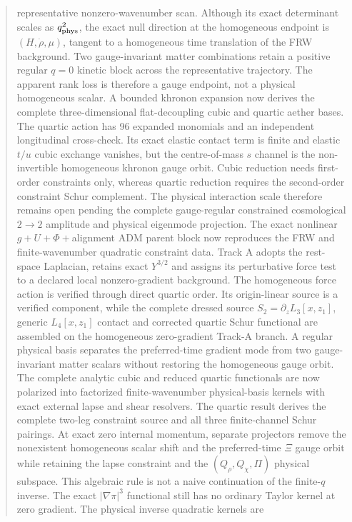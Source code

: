 ﻿\documentclass[11pt]{article}
\begin{document}
\begin{abstract}
representative nonzero-wavenumber scan.  Although its exact determinant scales
as $q_{\rm phys}^2$, the exact null direction at the homogeneous endpoint is
$(H,\dot\rho,\mu)$, tangent to a homogeneous time translation of the FRW
background.  Two gauge-invariant matter combinations retain a positive regular
$q=0$ kinetic block across the representative trajectory.  The apparent rank
loss is therefore a gauge endpoint, not a physical homogeneous scalar.  A
bounded khronon expansion now derives the complete three-dimensional
flat-decoupling cubic and quartic aether bases.  The quartic action has 96
expanded monomials and an independent longitudinal cross-check.  Its exact
elastic contact term is finite and elastic $t/u$ cubic exchange vanishes, but
the centre-of-mass $s$ channel is the non-invertible homogeneous khronon gauge
orbit.  Cubic reduction needs first-order constraints only, whereas quartic
reduction requires the second-order constraint Schur complement.  The physical
interaction scale therefore remains open pending the complete gauge-regular
constrained cosmological $2\to2$ amplitude and physical eigenmode projection.
The exact nonlinear $g+U+\Phi+$alignment ADM parent block now reproduces the
FRW and finite-wavenumber quadratic constraint data.  Track A adopts the
rest-space Laplacian, retains exact $Y^{3/2}$ and assigns its perturbative
force test to a declared local nonzero-gradient background.  The homogeneous
force action is verified through direct quartic order.  Its origin-linear
source is a verified component, while the complete dressed source
$S_2=\partial_zL_3[x,z_1]$, generic $L_4[x,z_1]$ contact and corrected
quartic Schur functional are assembled on the homogeneous zero-gradient
Track-A branch.  A regular physical basis separates the preferred-time
gradient mode from two gauge-invariant matter scalars without restoring the
homogeneous gauge orbit.  The complete analytic cubic and reduced quartic
functionals are now polarized into factorized finite-wavenumber
physical-basis kernels with exact
external lapse and shear resolvers.  The quartic result derives the complete
two-leg constraint source and all three finite-channel Schur pairings.  At
exact zero internal momentum, separate projectors remove the nonexistent
homogeneous scalar shift and the preferred-time $\Xi$ gauge orbit while
retaining the lapse constraint and the $(Q_\rho,Q_\chi,\Pi)$ physical
subspace.  This algebraic rule is not a naive continuation of the finite-$q$
inverse.  The exact $|\nabla\pi|^3$ functional still has no ordinary Taylor
kernel at zero gradient.  The physical inverse quadratic kernels are

\end{abstract}
\end{document}
